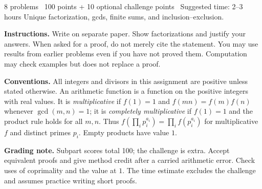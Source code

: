 
\newcommand{\setname}{Multiplicative functions}
\newcommand{\instructorbreak}{\ifsolutions\newpage\fi}
\newcommand{\credit}[1]{\par\smallskip
  {\footnotesize\color{muted}\textit{Grading:} #1}}
\ifsolutions
  \setlength{\parskip}{3pt}
  \setlength{\abovedisplayskip}{5pt}
  \setlength{\belowdisplayskip}{5pt}
\fi
{}


{8 problems \textbar\ 100 points + 10 optional challenge points \textbar\ Suggested time: 2--3 hours}
{Unique factorization, gcds, finite sums, and inclusion--exclusion.}

\textbf{Instructions.} Write on separate paper. Show factorizations and
justify your answers. When asked for a proof, do not merely cite the
statement. You may use results from earlier problems even if you have
not proved them. Computation may check examples but does not replace a proof.

\textbf{Conventions.} All integers and divisors in this assignment are
positive unless stated otherwise. An arithmetic function is a function
on the positive integers with real values. It is \emph{multiplicative} if
$f(1)=1$ and $f(mn)=f(m)f(n)$ whenever $\gcd(m,n)=1$; it is
\emph{completely multiplicative} if $f(1)=1$ and the product rule holds
for all $m,n$. Thus $f(\prod_i p_i^{a_i})=\prod_i f(p_i^{a_i})$
for multiplicative $f$ and distinct primes $p_i$. Empty products have value $1$.

\ifsolutions
\textbf{Grading note.} Subpart scores total 100; the challenge is extra.
Accept equivalent proofs and give method credit after a carried arithmetic
error. Check uses of coprimality and the value at $1$. The time estimate
excludes the challenge and assumes practice writing short proofs.
\fi


